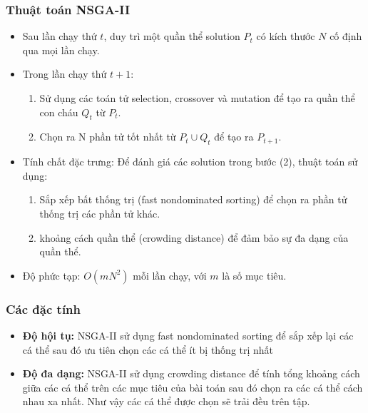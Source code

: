 \documentclass{beamer}
\begin{document}
    \begin{frame}
    \frametitle{\textbf{Thuật toán NSGA-II}}
        \begin{itemize}
            \item<1-> Sau lần chạy thứ $ t $, duy trì một quần thể solution $ P_t $ có kích thước $ N $ cố định qua mọi lần chạy.
            \item<2-> Trong lần chạy thứ $ t + 1 $:
            \begin{enumerate}
                \item<2-> Sử dụng các toán tử selection, crossover và mutation để tạo ra quần thể con cháu $ Q_t $ từ $ P_t $.
                \item<2-> Chọn ra N phần tử tốt nhất từ $ P_t \cup Q_t $ để tạo ra $ P_{t + 1} $.
            \end{enumerate}
            \item<3-> Tính chất đặc trưng: Để đánh giá các solution trong bước (2), thuật toán sử dụng:
            \begin{enumerate}
                \item<3-> Sắp xếp bất thống trị (fast nondominated sorting) để chọn ra phần tử thống trị các phần tử khác.
                \item<3-> khoảng cách quần thể (crowding distance) để đảm bảo sự đa dạng của quần thể.
            \end{enumerate}
            \item<4-> Độ phức tạp: $ O(mN^2) $ mỗi lần chạy, với $ m $ là số mục tiêu.
        \end{itemize}
    \end{frame}

    \begin{frame}
    \frametitle{\textbf{Các đặc tính}}
        \begin{itemize}
            \item<1-> \textbf{Độ hội tụ:} NSGA-II sử dụng fast nondominated sorting
            để sắp xếp lại các cá thể sau đó ưu tiên chọn các cá thể ít bị thống trị nhất
            \item<2-> \textbf{Độ đa dạng:} NSGA-II sử dụng crowding distance để tính tổng khoảng 
            cách giữa các cá thể trên các mục tiêu của bài toán sau đó chọn ra các cá thể cách nhau 
            xa nhất. Như vậy các cá thể được chọn sẽ trải đều trên tập.
        \end{itemize}
    \end{frame}

\end{document}
